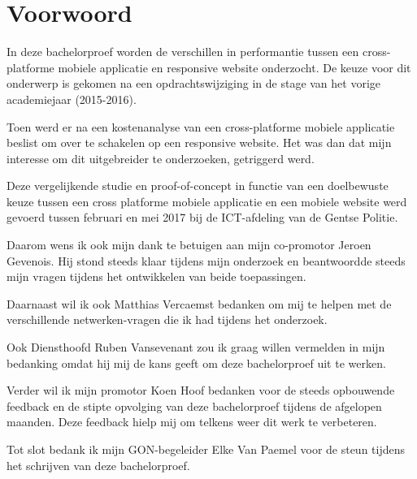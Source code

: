 
\chapter*{Voorwoord}
\label{ch:voorwoord}


In deze bachelorproef worden de verschillen in performantie tussen een cross-platforme mobiele applicatie en responsive website onderzocht.
De keuze voor dit onderwerp is gekomen na een opdrachtswijziging in de stage van het vorige academiejaar (2015-2016).

Toen werd er na een kostenanalyse van een cross-platforme mobiele applicatie beslist om over te schakelen op een responsive website.
Het was dan dat mijn interesse om dit uitgebreider te onderzoeken, getriggerd werd.

Deze vergelijkende studie en proof-of-concept in functie van een doelbewuste keuze tussen een cross platforme mobiele applicatie en
een mobiele website werd gevoerd tussen februari en mei 2017 bij de ICT-afdeling van de Gentse Politie.

Daarom wens ik ook mijn dank te betuigen aan mijn co-promotor Jeroen Gevenois. Hij stond steeds klaar tijdens mijn onderzoek en
beantwoordde steeds mijn vragen tijdens het ontwikkelen van beide toepassingen.

Daarnaast wil ik ook Matthias Vercaemst bedanken om mij te helpen met de verschillende netwerken-vragen die ik had tijdens het onderzoek.

Ook Diensthoofd Ruben Vansevenant zou ik graag willen vermelden in mijn bedanking omdat hij mij de kans geeft om deze bachelorproef uit te werken.

Verder wil ik mijn promotor Koen Hoof bedanken voor de steeds opbouwende feedback en de stipte opvolging van deze bachelorproef tijdens de afgelopen maanden.
Deze feedback hielp mij om telkens weer dit werk te verbeteren.

Tot slot bedank ik mijn GON-begeleider Elke Van Paemel voor de steun tijdens het schrijven van deze bachelorproef.
